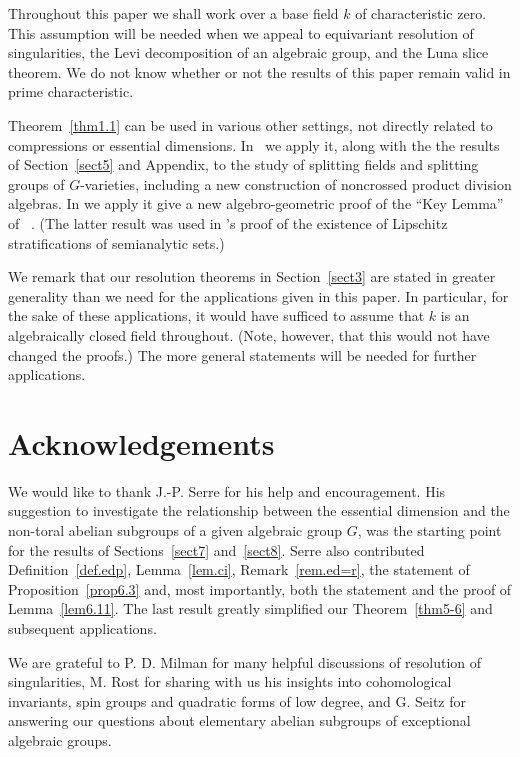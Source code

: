 Throughout this paper we shall work over a base field $k$ of characteristic 
zero. This assumption will be needed when we appeal to
equivariant resolution of singularities, the Levi decomposition 
of an algebraic group, and the Luna slice theorem. 
We do not know whether or not the results 
of this paper remain valid in prime characteristic.

Theorem~\ref{thm1.1} can be used in various other settings, not directly 
related to compressions or essential dimensions.  In~\cite{ry} we apply it, 
along with the the results of Section~\ref{sect5} and Appendix, to 
the study of splitting fields and splitting groups of $G$-varieties,
including a new construction of noncrossed product division algebras.
In \cite{pl} we apply it give a new algebro-geometric proof 
of the ``Key Lemma'' of \paru~\cite{P}. (The latter result was
used in \paru's proof of the existence of Lipschitz stratifications 
of semianalytic sets.)

We remark that our resolution theorems in Section~\ref{sect3} 
are stated in greater generality than we need for the applications 
given in this paper. In particular, for the sake of these applications, 
it would have sufficed to assume that $k$ is an algebraically closed 
field throughout. (Note, however, that this would not have changed 
the proofs.) The more general statements will be needed for further
applications.

\section*{Acknowledgements}

We would like to thank J.-P. Serre for his help and encouragement.  His 
suggestion to investigate the relationship between the essential dimension 
and the non-toral abelian subgroups of a given algebraic group $G$, was the
starting point for the results of Sections~\ref{sect7}
and~\ref{sect8}.  Serre also contributed Definition~\ref{def.edp}, 
Lemma~\ref{lem.ci}, Remark~\ref{rem.ed=r}, 
the statement of Proposition~\ref{prop6.3} 
and, most importantly, both the statement and the proof 
of Lemma~\ref{lem6.11}.  The last result greatly simplified 
our Theorem~\ref{thm5-6} and subsequent applications. 

We are grateful to
P. D. Milman for many helpful discussions of resolution of singularities,
M. Rost for sharing with us his insights into cohomological invariants,
spin groups and quadratic forms
of low degree, and G. Seitz for answering our questions 
about elementary abelian subgroups of exceptional algebraic groups.

